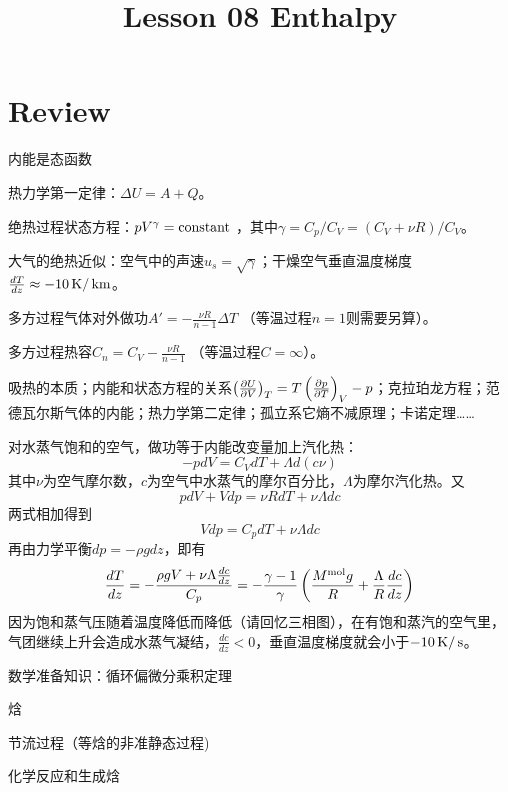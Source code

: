 \documentclass[CJK]{beamer}
\title{Lesson 08 Enthalpy}
\author{}
\date{}
\begin{document}

\section{Review}

\begin{frame}
\bch
\bitem
\item{内能是态函数}
\item{热力学第一定律：$\Delta U = A + Q$。}
\item{绝热过程状态方程：$pV^\gamma = \mathrm{constant}$ ，其中$\gamma = C_p/C_V = (C_V + \nu R)/C_V$。}
\item{大气的绝热近似：空气中的声速$u_s =\sqrt{\gamma}$；干燥空气垂直温度梯度$\frac{dT}{dz} \approx -10 \,\mathrm{K}/\,\mathrm{km}$。}
\item{多方过程气体对外做功$A' = -\frac{\nu R}{n-1}\Delta T$ （等温过程$n=1$则需要另算）。}
\item{多方过程热容$C_n =C_V -\frac{\nu R}{n-1}$ （等温过程$C = \infty$）。}
\item{吸热的本质；内能和状态方程的关系$\left(\frac{\partial U}{\partial V}\right)_{T} = T\left(\frac{\partial p}{\partial T}\right)_{V} - p$；克拉珀龙方程；范德瓦尔斯气体的内能；热力学第二定律；孤立系它熵不减原理；卡诺定理……}

\eitem
\ech
\end{frame}

\begin{frame}
\bch
{\small
对水蒸气饱和的空气，做功等于内能改变量加上汽化热：
$$ -pdV = C_V dT + \Lambda d(c\nu) $$
其中$\nu$为空气摩尔数，$c$为空气中水蒸气的摩尔百分比，$\Lambda$为摩尔汽化热。又
$$pdV + Vdp = \nu R dT + \nu \Lambda dc$$
两式相加得到
$$ Vdp = C_p  dT + \nu \Lambda dc $$
再由力学平衡$ dp = -\rho g dz$，即有
$$ \frac{dT}{dz} =-\frac{\rho g V + \nu\Lambda\frac{dc}{dz}}{C_p} = -\frac{\gamma-1}{\gamma}\left(\frac{M^{\rm mol}g}{R}+\frac{\Lambda}{R}\frac{dc}{dz}\right)$$
因为饱和蒸气压随着温度降低而降低（请回忆三相图），在有饱和蒸汽的空气里，气团继续上升会造成水蒸气凝结，$ \frac{dc}{dz} < 0 $，垂直温度梯度就会小于$-10\,\mathrm{K}/\,\mathrm{s}$。
}
\ech
\end{frame}




\begin{frame}
\bch
\bitem
\item{数学准备知识：循环偏微分乘积定理}
\item{焓}
\item{节流过程（等焓的非准静态过程)}
\item{化学反应和生成焓}
\eitem
\ech
\end{frame}
\end{document}
